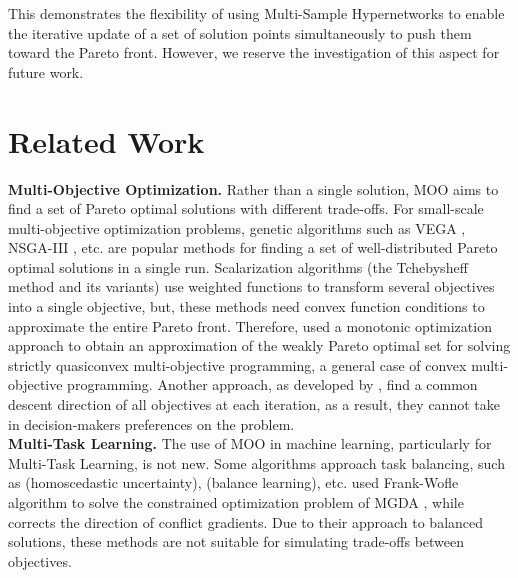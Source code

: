 \documentclass[letterpaper]{article} %
\begin{document}
This demonstrates the flexibility of using Multi-Sample Hypernetworks to enable the iterative update of a set of solution points simultaneously to push them toward the Pareto front. However, we reserve the investigation of this aspect for future work. 

\section{Related Work}
\label{st:4}
\indent \textbf{Multi-Objective Optimization.} Rather than a single solution, MOO aims to find a set of Pareto optimal solutions with different trade-offs. For small-scale multi-objective optimization problems, genetic algorithms such as VEGA \cite{inproceedings}, NSGA-III \cite{6600851}, etc. are popular methods for finding a set of well-distributed Pareto optimal solutions in a single run. Scalarization algorithms (the Tchebysheff method \cite{article} and its variants) use weighted functions to transform several objectives into a single objective, but, these methods need convex function conditions to approximate the entire Pareto front. Therefore, \cite{thang2020monotonic} used a monotonic optimization approach to obtain an approximation of the weakly Pareto optimal set for solving strictly quasiconvex multi-objective programming, a general case of convex multi-objective programming. Another approach, as developed by \cite{gradientbased1}, \cite{gradientbased3} find a common descent direction of all objectives at each iteration, as a result, they cannot take in decision-makers preferences on the problem.\\
\indent \textbf{Multi-Task Learning.} The use of MOO in machine learning, particularly for Multi-Task Learning, is not new.  Some algorithms approach task balancing, such as \cite{kendall2018multitask} (homoscedastic uncertainty), \cite{chen2018gradnorm} (balance learning), etc. \cite{sener2019multitask} used Frank-Wofle algorithm to solve the constrained optimization problem of MGDA \cite{gradientbased3}, while \cite{yu2020gradient} corrects the direction of conflict gradients. Due to their approach to balanced solutions, these methods are not suitable for simulating trade-offs between objectives. \\
\end{document}
